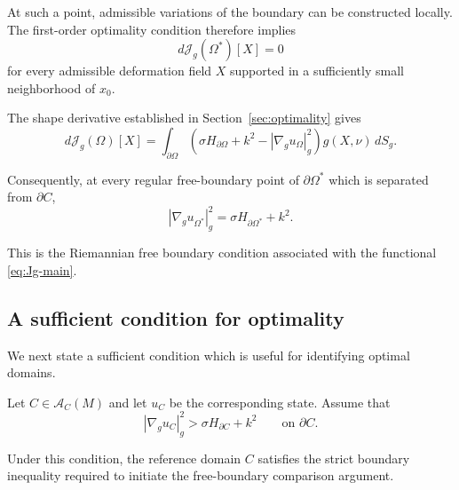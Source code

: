 \documentclass{article}
\renewcommand{\boxed}[1]{#1}
\begin{document}
At such a point, admissible variations of the boundary can be
constructed locally. The first-order optimality condition therefore
implies
\begin{equation}
d\mathcal J_g(\Omega^\ast)[X]=0
\end{equation}
for every admissible deformation field $X$ supported in a sufficiently
small neighborhood of $x_0$.

The shape derivative established in Section~\ref{sec:optimality} gives
\begin{equation}
d\mathcal J_g(\Omega)[X]
=
\int_{\partial\Omega}
\left(
\sigma H_{\partial\Omega}
+k^2
-
|\nabla_g u_\Omega|_g^2
\right)
g(X,\nu)\,dS_g.
\label{eq:first-variation-main}
\end{equation}

Consequently, at every regular free-boundary point of
$\partial\Omega^\ast$ which is separated from $\partial C$,
\begin{equation}
\boxed{
|\nabla_g u_{\Omega^\ast}|_g^2
=
\sigma H_{\partial\Omega^\ast}
+k^2.
}
\label{eq:free-boundary-condition}
\end{equation}

This is the Riemannian free boundary condition associated with the
functional \eqref{eq:Jg-main}.

\subsection{A sufficient condition for optimality}
\label{subsec:sufficient-condition}

We next state a sufficient condition which is useful for identifying
optimal domains.

Let $C\in\mathcal A_C(M)$ and let $u_C$ be the corresponding state.
Assume that
\begin{equation}
\boxed{
|\nabla_g u_C|_g^2
>
\sigma H_{\partial C}
+k^2
\qquad\text{on }\partial C.
}
\label{eq:sufficient-condition-C}
\end{equation}

Under this condition, the reference domain $C$ satisfies the strict
boundary inequality required to initiate the free-boundary comparison
argument.
\end{document}
